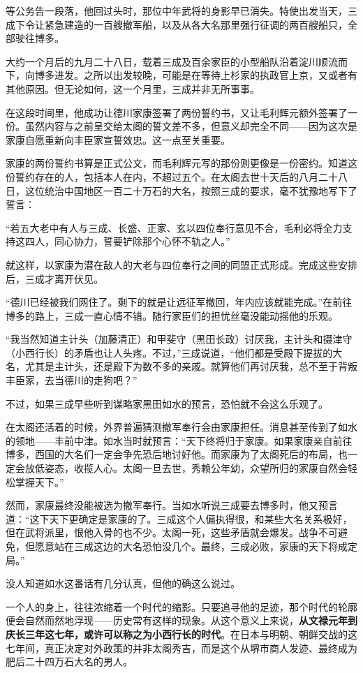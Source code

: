 \documentclass[
]{article}
\begin{document}
等公务告一段落，他回过头时，那位中年武将的身影早已消失。特使出发当天，三成下令让紧急建造的一百艘撤军船，以及从各大名那里强行征调的两百艘船只，全部驶往博多。

大约一个月后的九月二十八日，载着三成及百余家臣的小型船队沿着淀川顺流而下，向博多进发。之所以出发较晚，可能是在等待上杉家的执政官上京，又或者有其他原因。但无论如何，这一个月里，三成并非无所事事。

在这段时间里，他成功让德川家康签署了两份誓约书，又让毛利辉元额外签署了一份。虽然内容与之前呈交给太阁的誓文差不多，但意义却完全不同------因为这次是家康自愿重新向丰臣家宣誓效忠。这一点至关重要。

家康的两份誓约书算是正式公文，而毛利辉元写的那份则更像是一份密约。知道这份誓约存在的人，包括本人在内，不超过五个。在太阁去世十天后的八月二十八日，这位统治中国地区一百二十万石的大名，按照三成的要求，毫不犹豫地写下了誓言：

``若五大老中有人与三成、长盛、正家、玄以四位奉行意见不合，毛利必将全力支持这四人，同心协力，誓要铲除那个心怀不轨之人。''

就这样，以家康为潜在敌人的大老与四位奉行之间的同盟正式形成。完成这些安排后，三成才离开伏见。

``德川已经被我们网住了。剩下的就是让远征军撤回，年内应该就能完成。''在前往博多的路上，三成一直心情不错。随行家臣们的担忧丝毫没能动摇他的乐观。

``我当然知道主计头（加藤清正）和甲斐守（黑田长政）讨厌我，主计头和摄津守（小西行长）的矛盾也让人头疼。不过，''三成说道，``他们都是受殿下提拔的大名，尤其是主计头，还是殿下为数不多的亲戚。就算他们再讨厌我，总不至于背叛丰臣家，去当德川的走狗吧？''

不过，如果三成早些听到谋略家黑田如水的预言，恐怕就不会这么乐观了。

在太阁还活着的时候，外界普遍猜测撤军奉行会由家康担任。消息甚至传到了如水的领地------丰前中津。如水当时就预言：``天下终将归于家康。如果家康亲自前往博多，西国的大名们一定会争先恐后地讨好他。而家康为了太阁死后的布局，也一定会放低姿态，收揽人心。太阁一旦去世，秀赖公年幼，众望所归的家康自然会轻松掌握天下。''

然而，家康最终没能被选为撤军奉行。当如水听说三成要去博多时，他又预言道：``这下天下更确定是家康的了。三成这个人偏执得很，和某些大名关系极好，但在武将派里，恨他入骨的也不少。太阁一死，这些矛盾就会爆发。战争不可避免，但愿意站在三成这边的大名恐怕没几个。最终，三成必败，家康的天下将成定局。''

没人知道如水这番话有几分认真，但他的确这么说过。

一个人的身上，往往浓缩着一个时代的缩影。只要追寻他的足迹，那个时代的轮廓便会自然而然地浮现------历史常有这样的现象。从这个意义上来说，\textbf{从文禄元年到庆长三年这七年，或许可以称之为小西行长的时代}。在日本与明朝、朝鲜交战的这七年间，真正决定对外政策的并非太阁秀吉，而是这个从堺市商人发迹、最终成为肥后二十四万石大名的男人。
\end{document}
